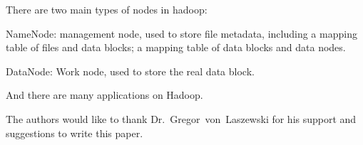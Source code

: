 There are two main types of nodes in hadoop:

NameNode: management node, used to store file metadata, including a mapping table of files and data blocks; a mapping table of data blocks and data nodes.

DataNode: Work node, used to store the real data block.


And there are many applications on Hadoop.


\begin{acks}

  The authors would like to thank Dr.~Gregor~von~Laszewski for his
  support and suggestions to write this paper.

\end{acks}


 

